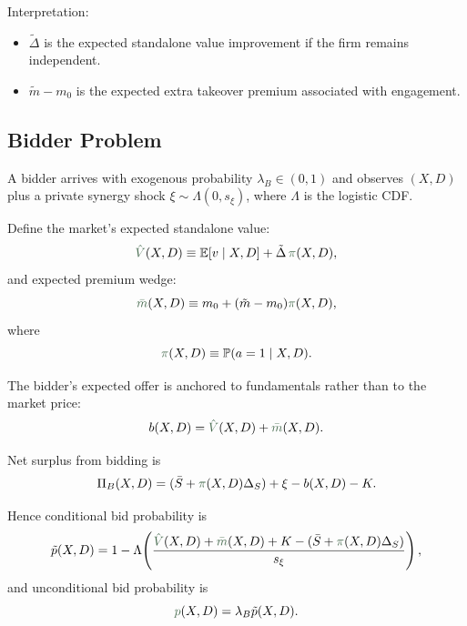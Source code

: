 \documentclass[11pt,a4paper]{article}
\theoremstyle{definition}
\theoremstyle{plain}
\theoremstyle{remark}
\newcommand{\E}{\mathbb{E}}
\newcommand{\PP}{\mathbb{P}}
\newcommand{\1}{\mathbf{1}}
\newcommand{\outcome}[1]{{\color{ForestGreen!50!black}#1}}
\begin{document}
Interpretation:
\begin{itemize}
\item $\tilde{\Delta}$ is the expected standalone value improvement if the firm remains independent.
\item $\tilde m-m_0$ is the expected extra takeover premium associated with engagement.
\end{itemize}

\subsection{Bidder Problem}

A bidder arrives with exogenous probability $\lambda_B \in (0,1)$ and observes $(X,D)$ plus a private synergy shock $\xi \sim \Lambda(0,s_\xi)$, where $\Lambda$ is the logistic CDF.

Define the market's expected standalone value:
\begin{equation}
\outcome{\hat V}(X,D) \equiv \E[v\mid X,D] + \tilde{\Delta}\,\outcome{\pi}(X,D),
\label{eq:Vhat}
\end{equation}
and expected premium wedge:
\begin{equation}
\outcome{\bar m}(X,D) \equiv m_0 + (\tilde m - m_0)\outcome{\pi}(X,D),
\label{eq:mbar}
\end{equation}
where
\begin{equation}
\outcome{\pi}(X,D) \equiv \PP(a=1\mid X,D).
\label{eq:pi-def}
\end{equation}

The bidder's expected offer is anchored to fundamentals rather than to the market price:
\begin{equation}
b(X,D) = \outcome{\hat V}(X,D) + \outcome{\bar m}(X,D).
\label{eq:bid-offer}
\end{equation}

Net surplus from bidding is
\begin{equation}
\Pi_B(X,D) = (\bar S + \outcome{\pi}(X,D)\Delta_S) + \xi - b(X,D) - K.
\label{eq:bidder-surplus}
\end{equation}

Hence conditional bid probability is
\begin{equation}
\tilde p(X,D)
=
1-\Lambda\!\left(
\frac{\outcome{\hat V}(X,D)+\outcome{\bar m}(X,D)+K-(\bar S+\outcome{\pi}(X,D)\Delta_S)}{s_\xi}
\right),
\label{eq:tilde-p}
\end{equation}
and unconditional bid probability is
\begin{equation}
\outcome{p}(X,D)=\lambda_B \tilde p(X,D).
\label{eq:p-def}
\end{equation}
\end{document}
